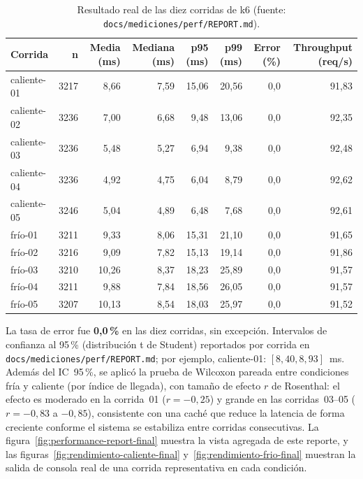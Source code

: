 \begin{table}[H]
  \centering
  \tiny
  \caption[Resultado real de las diez corridas de k6.]{Resultado real de las diez corridas de k6 (fuente: \texttt{docs/mediciones/perf/REPORT.md}).}
  \label{tab:k6-final}
  \begin{tabular}{@{}lrrrrrrr@{}}
    \toprule
    Corrida & n & Media (ms) & Mediana (ms) & p95 (ms) & p99 (ms) & Error (\%) & Throughput (req/s) \\
    \midrule
    caliente-01 & 3217 & 8{,}66 & 7{,}59 & 15{,}06 & 20{,}56 & 0{,}0 & 91{,}83 \\
    caliente-02 & 3236 & 7{,}00 & 6{,}68 & 9{,}48 & 13{,}06 & 0{,}0 & 92{,}35 \\
    caliente-03 & 3236 & 5{,}48 & 5{,}27 & 6{,}94 & 9{,}38 & 0{,}0 & 92{,}48 \\
    caliente-04 & 3236 & 4{,}92 & 4{,}75 & 6{,}04 & 8{,}79 & 0{,}0 & 92{,}62 \\
    caliente-05 & 3246 & 5{,}04 & 4{,}89 & 6{,}48 & 7{,}68 & 0{,}0 & 92{,}61 \\
    fr\'io-01 & 3211 & 9{,}33 & 8{,}06 & 15{,}31 & 21{,}10 & 0{,}0 & 91{,}65 \\
    fr\'io-02 & 3216 & 9{,}09 & 7{,}82 & 15{,}13 & 19{,}14 & 0{,}0 & 91{,}86 \\
    fr\'io-03 & 3210 & 10{,}26 & 8{,}37 & 18{,}23 & 25{,}89 & 0{,}0 & 91{,}57 \\
    fr\'io-04 & 3211 & 9{,}88 & 7{,}84 & 18{,}56 & 26{,}05 & 0{,}0 & 91{,}57 \\
    fr\'io-05 & 3207 & 10{,}13 & 8{,}54 & 18{,}03 & 25{,}97 & 0{,}0 & 91{,}52 \\
    \bottomrule
  \end{tabular}
\end{table}

La tasa de error fue \textbf{0{,}0\,\%} en las diez corridas, sin
excepci\'on. Intervalos de confianza al 95\,\% (distribuci\'on t de
Student) reportados por corrida en \texttt{docs/mediciones/perf/REPORT.md};
por ejemplo, caliente-01: $[8{,}40, 8{,}93]$~ms. Adem\'as del IC~95\,\%,
se aplic\'o la prueba de Wilcoxon pareada entre condiciones fr\'ia y
caliente (por \'indice de llegada), con tama\~no de efecto $r$ de
Rosenthal: el efecto es moderado en la corrida~01 ($r=-0{,}25$) y grande en
las corridas~03--05 ($r=-0{,}83$ a $-0{,}85$), consistente con una cach\'e
que reduce la latencia de forma creciente conforme el sistema se estabiliza
entre corridas consecutivas. La figura~\ref{fig:performance-report-final}
muestra la vista agregada de este reporte, y las
figuras~\ref{fig:rendimiento-caliente-final}
y~\ref{fig:rendimiento-frio-final} muestran la salida de consola real de
una corrida representativa en cada condici\'on.

